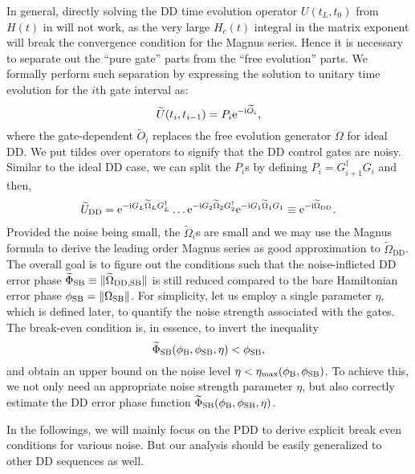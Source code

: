 \documentclass[pra,reprint,superscriptaddress]{revtex4-2}
\newcommand{\wt}[1]{\widetilde{#1}}
\newcommand{\wtep}{\widetilde{\Phi}_\mathrm{SB}}
\newcommand{\rDD}{\mathrm{DD}}
\newcommand{\rmax}{\mathrm{max}}
\begin{document}
In general, directly solving the DD time evolution operator $U(t_L,t_0)$ from $H(t)$ in  will not work, as the very large $H_c(t)$ integral in the matrix exponent will break the convergence condition for the Magnus series. Hence it is necessary to separate out the ``pure gate'' parts from the ``free evolution'' parts. We formally perform such separation  by  expressing the solution to unitary time evolution for the $i$th gate interval as:
\begin{equation}\label{eq:noisy-gate-formal}
 \wt U(t_i,t_{i-1})
 = P_i \upe^{-\upi \wt O_i}, 
\end{equation}
where the gate-dependent $\wt O_i$ replaces the free evolution generator $\Omega$ for ideal DD. 
We put tildes over operators to signify that the DD control gates are noisy. 
Similar to the ideal DD case, we can split the $P_i$s by defining $P_i=G_{i+1}^\dagger G_{i}$ and then,
\begin{equation}
\begin{aligned}
  \wt U_\rDD= \upe^{-\upi  G_L \wt{\Omega}_L  G_L^\dagger} \ldots
  \upe^{-\upi G_2 \wt{\Omega}_2  G_2^\dagger} \upe^{-\upi G_1\wt{\Omega}_1G_1}\equiv\upe^{-\upi\wt{\Omega}_\rDD} .
\end{aligned}
\end{equation}
Provided the noise being small, the $\wt{\Omega}_i$s are small and we may use the Magnus formula to derive the leading order Magnus series as good approximation to $\wt{\Omega}_\rDD$.
The overall goal is to figure out the conditions such that the noise-inflicted DD error phase $\wtep \equiv \norm{\wt{\Omega}_{\rDD,\rSB}}$  is still reduced compared to the bare Hamiltonian error phase $\phi_{\mathrm{SB}} = \Vert {\Omega_{\mathrm{SB}}} \Vert$. For simplicity, let us employ a single parameter $\eta$, which is defined later,  to quantify the noise strength associated with the gates.  The break-even condition is, in essence, to invert the inequality
\begin{equation}
 \wtep(\phi_\rB,\phi_\rSB,\eta) < \phi_\rSB,
\end{equation} 
and obtain an upper bound on the noise level $\eta<\eta_{\rmax}(\phi_\rB, \phi_\rSB)$.
To achieve this, we not only need an appropriate noise strength parameter $\eta$, but also correctly estimate the DD error phase function $\wtep(\phi_\rB,\phi_\rSB,\eta)$.  

 In the followings, we will mainly focus on the PDD to derive explicit break even conditions for various noise. But our analysis should be easily generalized to other DD sequences as well.
\end{document}
